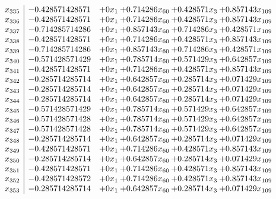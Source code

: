 \documentclass[11pt]{article}
\begin{document}
\[\begin{array}{c| c c@{\hskip 2pt} c@{\hskip 2pt} c@{\hskip 2pt} c@{\hskip 2pt} }
 x_{335}   &  -0.428571428571 & + 0 x_{1} & + 0.714286 x_{60} & + 0.428571 x_{3} & + 0.857143 x_{109}\\
 x_{336}   &  -0.428571428571 & + 0 x_{1} & + 0.714286 x_{60} & + 0.428571 x_{3} & + 0.857143 x_{109}\\
 x_{337}   &  -0.714285714286 & + 0 x_{1} & + 0.857143 x_{60} & + 0.714286 x_{3} & + 0.428571 x_{109}\\
 x_{338}   &  -0.428571428571 & + 0 x_{1} & + 0.714286 x_{60} & + 0.428571 x_{3} & + 0.857143 x_{109}\\
 x_{339}   &  -0.714285714286 & + 0 x_{1} & + 0.857143 x_{60} & + 0.714286 x_{3} & + 0.428571 x_{109}\\
 x_{340}   &  -0.571428571429 & + 0 x_{1} & + 0.785714 x_{60} & + 0.571429 x_{3} & + 0.642857 x_{109}\\
 x_{341}   &  -0.428571428571 & + 0 x_{1} & + 0.714286 x_{60} & + 0.428571 x_{3} & + 0.857143 x_{109}\\
 x_{342}   &  -0.285714285714 & + 0 x_{1} & + 0.642857 x_{60} & + 0.285714 x_{3} & + 0.071429 x_{109}\\
 x_{343}   &  -0.285714285714 & + 0 x_{1} & + 0.642857 x_{60} & + 0.285714 x_{3} & + 0.071429 x_{109}\\
 x_{344}   &  -0.285714285714 & + 0 x_{1} & + 0.642857 x_{60} & + 0.285714 x_{3} & + 0.071429 x_{109}\\
 x_{345}   &  -0.571428571429 & + 0 x_{1} & + 0.785714 x_{60} & + 0.571429 x_{3} & + 0.642857 x_{109}\\
 x_{346}   &  -0.571428571428 & + 0 x_{1} & + 0.785714 x_{60} & + 0.571429 x_{3} & + 0.642857 x_{109}\\
 x_{347}   &  -0.571428571428 & + 0 x_{1} & + 0.785714 x_{60} & + 0.571429 x_{3} & + 0.642857 x_{109}\\
 x_{348}   &  -0.285714285714 & + 0 x_{1} & + 0.642857 x_{60} & + 0.285714 x_{3} & + 0.071429 x_{109}\\
 x_{349}   &  -0.428571428571 & + 0 x_{1} & + 0.714286 x_{60} & + 0.428571 x_{3} & + 0.857143 x_{109}\\
 x_{350}   &  -0.285714285714 & + 0 x_{1} & + 0.642857 x_{60} & + 0.285714 x_{3} & + 0.071429 x_{109}\\
 x_{351}   &  -0.428571428571 & + 0 x_{1} & + 0.714286 x_{60} & + 0.428571 x_{3} & + 0.857143 x_{109}\\
 x_{352}   &  -0.428571428572 & + 0 x_{1} & + 0.714286 x_{60} & + 0.428571 x_{3} & + 0.857143 x_{109}\\
 x_{353}   &  -0.285714285714 & + 0 x_{1} & + 0.642857 x_{60} & + 0.285714 x_{3} & + 0.071429 x_{109}\\

\end{array}\]
\end{document}
